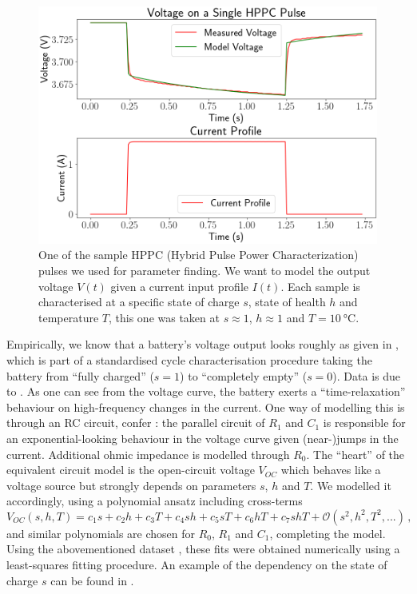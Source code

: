 \documentclass{prettytex/ox/mmsc-special-topic}
\begin{document}
  \begin{figure}[H]
    \centering
    \includegraphics[width=0.6\linewidth]{figures/hppc-pulse.png}
    \caption{One of the sample HPPC (Hybrid Pulse Power Characterization) pulses we used for parameter finding. We want to model the output voltage $V(t)$ given a current input profile $I(t)$. Each sample is characterised at a specific state of charge $s$, state of health $h$ and temperature $T$, this one was taken at $s \approx 1$, $h \approx 1$ and $T = \SI{10}{\degreeCelsius}$.}
    \label{fig:hppc-pulse}
  \end{figure}

  Empirically, we know that a battery's voltage output looks roughly as given in , which is part of a standardised cycle characterisation procedure taking the battery from ``fully charged'' ($s=1$) to ``completely empty'' ($s=0$). Data is due to \cite{panasonicnums}.
  As one can see from the voltage curve, the battery exerts a ``time-relaxation'' behaviour on high-frequency changes in the current.
  One way of modelling this is through an RC circuit, confer : the parallel circuit of $R_1$ and $C_1$ is responsible for an exponential-looking behaviour in the voltage curve given (near-)jumps in the current.
  Additional ohmic impedance is modelled through $R_0$.
  The ``heart'' of the equivalent circuit model is the open-circuit voltage $V_{OC}$ which behaves like a voltage source but strongly depends on parameters $s$, $h$ and $T$.
  We modelled it accordingly, using a polynomial ansatz including cross-terms $$V_{OC}(s, h, T) = c_1 s + c_2 h + c_3 T + c_4 sh + c_5 sT + c_6 hT + c_7 shT + \mathcal{O}(s^2, h^2, T^2, ...)\,,$$
  and similar polynomials are chosen for $R_0$, $R_1$ and $C_1$, completing the model.
  Using the abovementioned dataset \parencite{panasonicnums}, these fits were obtained numerically using a least-squares fitting procedure. An example of the dependency on the state of charge $s$ can be found in .
\end{document}
